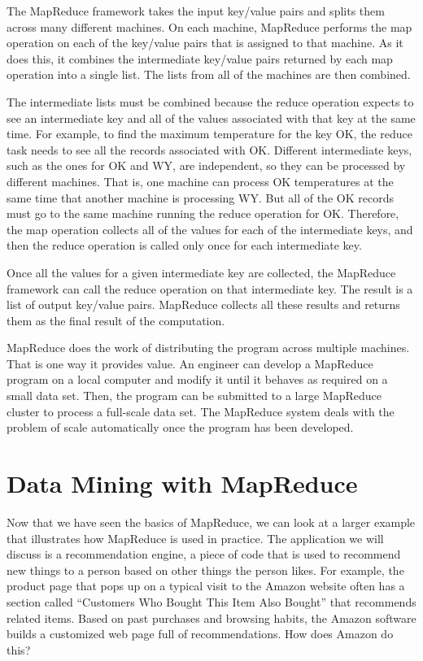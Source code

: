The MapReduce framework
takes the input key/value pairs and splits them across many
different machines.
On each machine, MapReduce performs the map
operation on each of the key/value pairs that is assigned to
that machine.  As it does this, it combines the intermediate
key/value pairs returned by each map operation into a single
list.  The lists from all of the machines are then combined.

The intermediate lists must be combined because
the reduce operation expects to see an intermediate key and all
of the values associated with that key at the same time. For example,
to find the maximum temperature for the key \textsf{OK}, the reduce
task needs to see all the records associated with \textsf{OK}.
Different intermediate keys, such as the ones for \textsf{OK} and \textsf{WY},
are independent, so they can be processed by different machines.
That is, one machine can process \textsf{OK} temperatures at the same
time that another machine is processing \textsf{WY}.
But all of the \textsf{OK} records must go to the same machine running
the reduce operation for \textsf{OK}.
Therefore, the map operation collects all of the values for
each of the intermediate keys, and then the reduce operation is
called only once for each intermediate key.

Once all the values for a given intermediate key are
collected, the MapReduce framework can call the reduce
operation on that intermediate key.  The result is a list of
output key/value pairs. MapReduce collects all these
results and returns them as the final result of the computation.

MapReduce does the work of distributing
the program across multiple machines.
That is one way it provides value.
An engineer can develop a MapReduce program on
a local computer and modify it until it behaves as
required on a small data set.
Then, the program can be submitted to a large MapReduce cluster
to process a full-scale data set.
The MapReduce system deals with the problem of scale
automatically once the program has been developed.

\section{Data Mining with MapReduce}

Now
that we have seen the basics of MapReduce, we can look at
a larger example that illustrates how MapReduce is
used in practice.  The application we will discuss is a recommendation engine,
a piece of code that is used to recommend new things to a person
based on other things the person likes.
For example, the product page that pops up on a typical visit to
the Amazon website often has a section called ``Customers Who Bought
This Item Also Bought'' that recommends related items.
Based on past purchases and browsing habits, the Amazon software
builds a customized web page full of recommendations.
How does Amazon do this?

